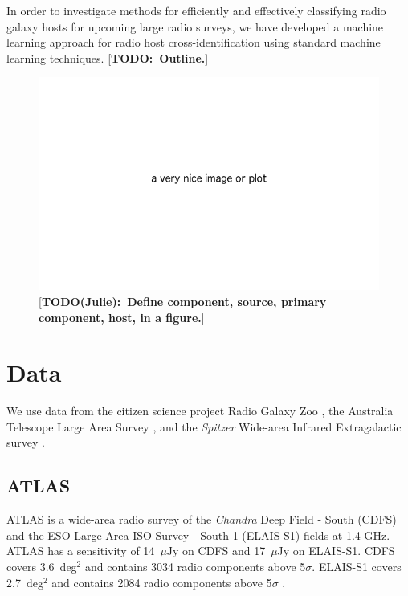 \documentclass[fleqn,usenatbib,usedcolumn]{mnras}
\newcommand{\matthew}[2]{ {\color{white!20!violet}[{\bf TODO(#1):~{#2}}]} }
\newcommand{\todo}[1]{ {\color{red}[{\bf TODO:~{#1}}]} }
\begin{document}

  In order to investigate methods for efficiently and effectively classifying
  radio galaxy hosts for upcoming large radio surveys, we have developed a
  machine learning approach for radio host cross-identification using standard
  machine learning techniques. \todo{Outline.}

  \begin{figure}
    \includegraphics[width=\linewidth]{images/placeholder.png}
    \caption{\matthew{Julie}{Define component, source, primary component, host, in a figure.}}
  \end{figure}

\section{Data}\label{data}
    
  We use data from the citizen science project Radio Galaxy Zoo
  \citep{banfield15}, the Australia Telescope Large Area Survey
  \citep[ATLAS;][]{franzen15}, and the \emph{Spitzer} Wide-area Infrared
  Extragalactic survey \citep[SWIRE;][]{lonsdale03swire, surace05swire}.

  \subsection{ATLAS}\label{sec:atlas}

    ATLAS \citep{franzen15} is a wide-area radio survey of the \emph{Chandra}
    Deep Field - South (CDFS) and the ESO Large Area ISO Survey - South 1
    (ELAIS-S1) fields at 1.4 GHz. ATLAS has a sensitivity of 14~$\mu$Jy on CDFS
    and 17~$\mu$Jy on ELAIS-S1. CDFS covers 3.6~deg$^2$ and contains 3034 radio
    components above 5$\sigma$. ELAIS-S1 covers 2.7~deg$^2$ and contains 2084
    radio components above 5$\sigma$ \citep{franzen15}.
\end{document}
